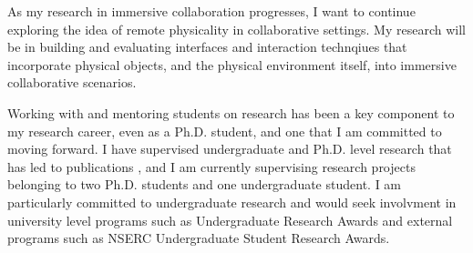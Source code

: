 As my research in immersive collaboration progresses, I want to continue exploring the idea of remote physicality in collaborative settings. My research will be in building and evaluating interfaces and interaction technqiues that incorporate physical objects, and the physical environment itself, into immersive collaborative scenarios.  

Working with and mentoring students on research has been a key component to my research career, even as a Ph.D. student, and one that I am committed to moving forward. I have supervised undergraduate and Ph.D. level research that has led to publications \cite{you2019strafing, adeniyi2021red, you2022strafing}, and I am currently supervising research projects belonging to two Ph.D. students and one undergraduate student. I am particularly committed to undergraduate research and would seek involvment in university level programs such as Undergraduate Research Awards and external programs such as NSERC Undergraduate Student Research Awards.





\label{research_last}
